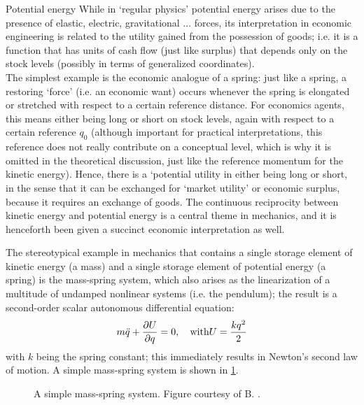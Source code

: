\begin{econ}{Potential energy}
    While in `regular physics' potential energy arises due to the presence of elastic, electric, gravitational ... forces, its interpretation in economic engineering is related to the utility gained from the possession of goods; i.e. it is a function that has units of cash flow (just like surplus) that depends only on the stock levels (possibly in terms of generalized coordinates).\\

    The simplest example is the economic analogue of a spring: just like a spring, a restoring `force' (i.e. an economic want) occurs whenever the spring is elongated or stretched with respect to a certain reference distance. For economics agents, this means either being long or short on stock levels, again with respect to a certain reference $q_0$ (although important for practical interpretations, this reference does not really contribute on a conceptual level, which is why it is omitted in the theoretical discussion, just like the reference momentum for the kinetic energy). Hence, there is a `potential utility in either being long or short, in the sense that it can be exchanged for `market utility' or economic surplus, because it requires an exchange of goods. The continuous reciprocity between kinetic energy and 
    potential energy is a central theme in mechanics, and it is henceforth been given a succinct economic interpretation as well.
\end{econ}
The stereotypical example in mechanics that contains a single storage element of kinetic energy (a mass) and a single storage  element of potential energy (a spring) is the mass-spring system, which also arises as the linearization of a multitude of undamped nonlinear systems (i.e. the pendulum); the result is a second-order scalar autonomous differential equation:
\begin{equation}
    m\ddot{q} + \pdv{U}{q} = 0, \quad \text{with} U = \frac{kq^2}{2}
    \label{eq:mass_spring}
\end{equation}
with $k$ being the spring constant; this immediately results in Newton's second law of motion. A simple mass-spring system is shown in \cref{fig:mass_spring}.
\begin{figure}[ht]
    \centering
    
    \caption{A simple mass-spring system. Figure courtesy of B. \citet{Krabbenborg2021}.}
    \label{fig:mass_spring}
\end{figure}

